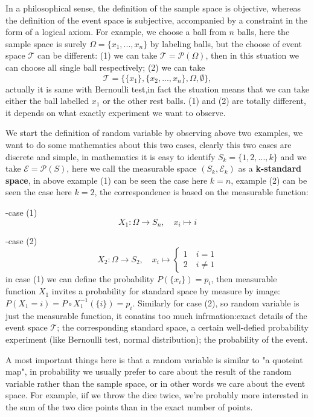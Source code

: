 \documentclass[en,geye,blue,normal,12pt,bibend=bibtex]{elegantnote}
\begin{document}
In a philosophical sense, the definition of the sample space is objective, whereas the definition of the event space is subjective, accompanied by a constraint in the form of a logical axiom. For example, we choose a ball from \(n\) balls, here the sample space is surely \(\Omega=\{x_1,...,x_n\}\) by labeling balls, but the choose of event space \(\mathcal{T}\) can be different: (1) we can take \(\mathcal{T}=\mathcal{P}(\Omega)\), then in this stuation we can choose all single ball respectively; (2) we can take
\[\mathcal{T} = \{\{x_1\},\{x_2,...,x_n\},\Omega, \emptyset\},\]
actually it is same with Bernoulli test,in fact the stuation means that we can take either the ball labelled \(x_1\) or the other rest balls. (1) and (2) are totally different, it depends on what exactly experiment we want to observe. 

We start the definition of random variable by observing above two examples, we want to do some mathematics about this two cases, clearly this two cases are discrete and simple, in mathematics it is easy to identify \(S_k=\{1,2,...,k\}\) and we take \(\mathcal{E} = \mathcal{P}(S)\), here we call the measurable space \((S_k,\mathcal{E}_k)\) as a \textbf{k-standard space}, in above example (1) can be seen the case here \(k=n\), example (2) can be seen the case here \(k=2\), the correspondence is based on the measurable function:

-case (1)
\[X_1:\Omega \to S_n, \quad x_i \mapsto i\]

-case (2)
\[X_2: \Omega \to S_2, \quad x_i \mapsto \begin{cases}
    1 \quad i=1 \\
    2 \quad i \neq 1
\end{cases}\]
in case (1) we can define the probability \(P(\{x_i\})=p_i\), then measurable function \(X_1\) invites a probability for standard space by measure by image: \(P(X_1 = i) = P\circ X_1^{-1}(\{i\}) = p_i\). Similarly for case (2), so random variable is just the measurable function, it conatins too much infrmation:exact details of the event space \(\mathcal{T}\); the corresponding standard space, a certain well-defied probability experiment (like Bernoulli test, normal distribution); the probability of the event.

A most important things here is that a random variable is similar to "a quoteint map", in probability we usually prefer to care about the result of the random variable rather than the sample space, or in other words we care about the event space. For example, iif we throw the dice twice, we're probably more interested in the sum of the two dice points than in the exact number of points.
\end{document}
